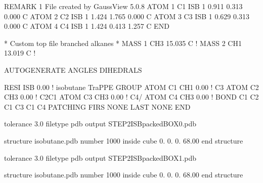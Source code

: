\documentclass[letterpaper,10pt,english]{sphinxmanual}
\begin{document}
\sphinxAtStartPar
{}

\begin{sphinxVerbatim}[commandchars=\\\{\}]
REMARK   1 File  created   by  GaussView   5.0.8
ATOM          1       C1  ISB          1   0.911   \PYGZhy{}0.313    0.000  C
ATOM          2       C2  ISB          1   1.424   \PYGZhy{}1.765    0.000  C
ATOM          3       C3  ISB          1  \PYGZhy{}0.629   \PYGZhy{}0.313    0.000  C
ATOM          4       C4  ISB          1   1.424    0.413   \PYGZhy{}1.257  C
END
\end{sphinxVerbatim}

\sphinxAtStartPar
{}

\begin{sphinxVerbatim}[commandchars=\\\{\}]
* Custom top file \PYGZhy{}\PYGZhy{} branched alkanes
*
MASS     1    CH3      15.035 C !
MASS     2    CH1      13.019 C !

AUTOGENERATE ANGLES DIHEDRALS

RESI   ISB   0.00               !  isobutane \PYGZob{} TraPPE \PYGZcb{}
GROUP
ATOM    C1    CH1       0.00    !  C3\PYGZbs{}
ATOM    C2    CH3       0.00    !     C2\PYGZhy{}C1
ATOM    C3    CH3       0.00    !  C4/
ATOM    C4    CH3       0.00    !
BOND    C1  C2   C1  C3   C1  C4
PATCHING FIRS NONE LAST NONE
END
\end{sphinxVerbatim}

\sphinxAtStartPar
{}

\begin{sphinxVerbatim}[commandchars=\\\{\}]
tolerance   3.0
filetype    pdb
output      STEP2\PYGZus{}ISB\PYGZus{}packed\PYGZus{}BOX\PYGZus{}0.pdb

structure     isobutane.pdb
number        1000
inside cube   0.  0.  0.  68.00
end structure
\end{sphinxVerbatim}

\sphinxAtStartPar
{}

\begin{sphinxVerbatim}[commandchars=\\\{\}]
tolerance   3.0
filetype    pdb
output      STEP2\PYGZus{}ISB\PYGZus{}packed\PYGZus{}BOX\PYGZus{}1.pdb

structure     isobutane.pdb
number        1000
inside cube   0.  0.  0.  68.00
end structure
\end{sphinxVerbatim}
\end{document}
